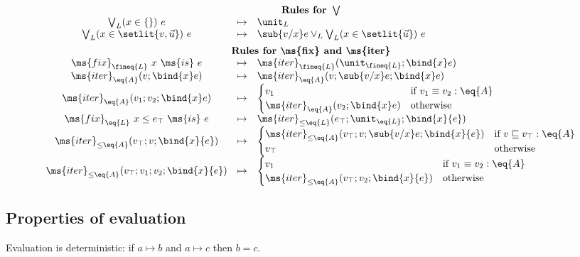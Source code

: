 \documentclass{article}
\newcommand{\ale}{\sqsubseteq}
\newcommand{\aeq}{\equiv}
\newcommand{\tforin}[2]{\bigvee_{#1}(#2)\ }
\newcommand{\tfix}[2]{\ms{fix}_{#1}~{#2}~\ms{is}~}
\newcommand{\tfixle}[3]{\tfix{#1}{#2 \le #3}}
\newcommand{\iter}[4]{\ms{iter}_{#1}({#2}; \bind{#3}#4)}
\newcommand{\iterstep}[5]{\ms{iter}_{#1}({#2}; {#3}; {\bind{#4}#5})}
\newcommand{\iterle}[5]{\ms{iter}_{{\le}#1}({#2}; {#3}; \bind{#4}{#5})}
\newcommand{\iterlestep}[6]{\ms{iter}_{{\le}#1}({#2}; {#3}; {#4}; \bind{#5}{#6})}
\newcommand{\step}{\mapsto}
\begin{document}
\[\begin{array}{ccl}
  \vspace{0.5em}\\
  \multicolumn{3}{c}{\textbf{Rules for }\bigvee}\\
  \tforin{L}{x \in \{\}} e &\step& \unit_L\\
  \tforin{L}{x \in \setlit{v, \vec{u}}} e
  &\step& \sub{v/x} e \vee_L \tforin{L}{x \in \setlit{\vec{u}}} e

  \vspace{0.5em}\\
  \multicolumn{3}{c}{\textbf{Rules for \ms{fix} and \ms{iter}}}\\
  \tfix{\fineq{L}}{x}{e} &\step& \iter{\fineq{L}}{\unit_{\fineq{L}}}{x}{e}\\
  \iter{\eq{A}}{v}{x}{e} &\step& \iterstep{\eq{A}}{v}{\sub{v/x} e}{x}{e}\\
  \iterstep{\eq{A}}{v_1}{v_2}{x}{e}
  &\step& \begin{cases}
    v_1 & \text{if}~{v_1 \aeq v_2 : \eq{A}}\\
    \iter{\eq{A}}{v_2}{x}{e} & \text{otherwise}
  \end{cases}\\
  \tfixle{\eq{L}}{x}{e_\top}{e} &\step& \iterle{\eq{L}}{e_\top}{\unit_{\eq{L}}}{x}{e}\\
  \iterle{\eq{A}}{v_\top}{v}{x}{e}
  &\step& \begin{cases}
    \iterlestep{\eq{A}}{v_\top}{v}{\sub{v/x} e}{x}{e} & \text{if}~{v \ale v_\top : \eq{A}}\\
    v_\top & \text{otherwise}
  \end{cases}\\
  \iterlestep{\eq{A}}{v_\top}{v_1}{v_2}{x}{e}
  &\step& \begin{cases}
    v_1 &\text{if}~{v_1 \aeq v_2 : \eq{A}}\\
    \iterle{\eq{A}}{v_\top}{v_2}{x}{e} & \text{otherwise}
  \end{cases}
\end{array}
\]

\subsection{Properties of evaluation}

\begin{theorem}\label{thm:determinism}
  Evaluation is deterministic: if $a \step b$ and $a \step c$ then $b = c$.
\end{theorem}
\end{document}
